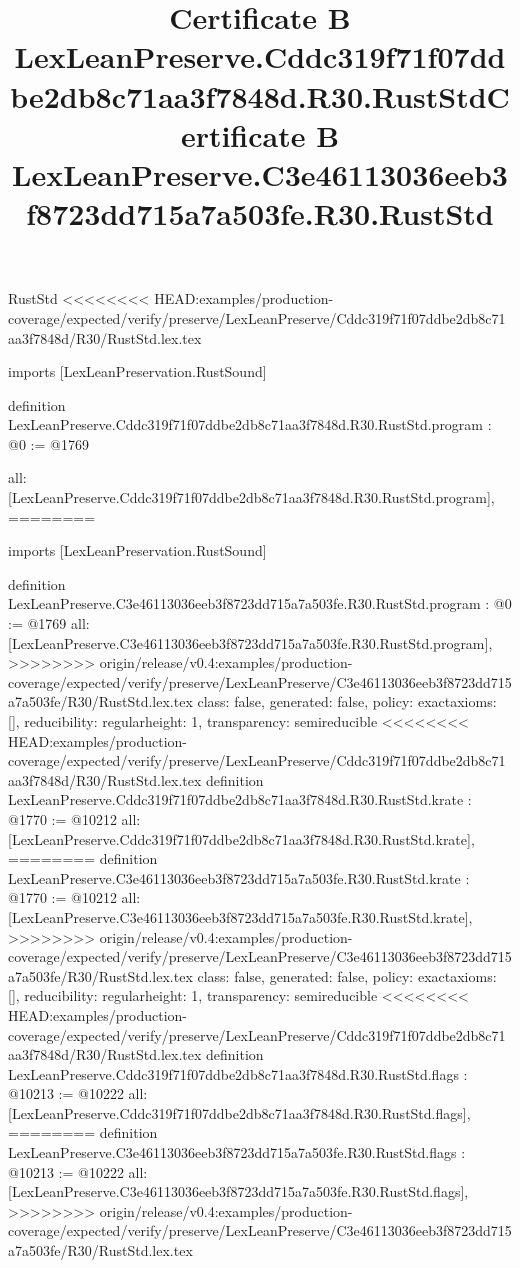 \begin{lexlean}{RustStd}
<<<<<<<< HEAD:examples/production-coverage/expected/verify/preserve/LexLeanPreserve/Cddc319f71f07ddbe2db8c71aa3f7848d/R30/RustStd.lex.tex
\title{Certificate B LexLeanPreserve.Cddc319f71f07ddbe2db8c71aa3f7848d.R30.RustStd}
\begin{coremodule}
imports [LexLeanPreservation.RustSound]

definition LexLeanPreserve.Cddc319f71f07ddbe2db8c71aa3f7848d.R30.RustStd.program : @0 := @1769 {
  all: [LexLeanPreserve.Cddc319f71f07ddbe2db8c71aa3f7848d.R30.RustStd.program],
========
\title{Certificate B LexLeanPreserve.C3e46113036eeb3f8723dd715a7a503fe.R30.RustStd}
\begin{coremodule}
imports [LexLeanPreservation.RustSound]

definition LexLeanPreserve.C3e46113036eeb3f8723dd715a7a503fe.R30.RustStd.program : @0 := @1769 {
  all: [LexLeanPreserve.C3e46113036eeb3f8723dd715a7a503fe.R30.RustStd.program],
>>>>>>>> origin/release/v0.4:examples/production-coverage/expected/verify/preserve/LexLeanPreserve/C3e46113036eeb3f8723dd715a7a503fe/R30/RustStd.lex.tex
  class: false,
  generated: false,
  policy: exact{axioms: []},
  reducibility: regular{height: 1},
  transparency: semireducible
}
<<<<<<<< HEAD:examples/production-coverage/expected/verify/preserve/LexLeanPreserve/Cddc319f71f07ddbe2db8c71aa3f7848d/R30/RustStd.lex.tex
definition LexLeanPreserve.Cddc319f71f07ddbe2db8c71aa3f7848d.R30.RustStd.krate : @1770 := @10212 {
  all: [LexLeanPreserve.Cddc319f71f07ddbe2db8c71aa3f7848d.R30.RustStd.krate],
========
definition LexLeanPreserve.C3e46113036eeb3f8723dd715a7a503fe.R30.RustStd.krate : @1770 := @10212 {
  all: [LexLeanPreserve.C3e46113036eeb3f8723dd715a7a503fe.R30.RustStd.krate],
>>>>>>>> origin/release/v0.4:examples/production-coverage/expected/verify/preserve/LexLeanPreserve/C3e46113036eeb3f8723dd715a7a503fe/R30/RustStd.lex.tex
  class: false,
  generated: false,
  policy: exact{axioms: []},
  reducibility: regular{height: 1},
  transparency: semireducible
}
<<<<<<<< HEAD:examples/production-coverage/expected/verify/preserve/LexLeanPreserve/Cddc319f71f07ddbe2db8c71aa3f7848d/R30/RustStd.lex.tex
definition LexLeanPreserve.Cddc319f71f07ddbe2db8c71aa3f7848d.R30.RustStd.flags : @10213 := @10222 {
  all: [LexLeanPreserve.Cddc319f71f07ddbe2db8c71aa3f7848d.R30.RustStd.flags],
========
definition LexLeanPreserve.C3e46113036eeb3f8723dd715a7a503fe.R30.RustStd.flags : @10213 := @10222 {
  all: [LexLeanPreserve.C3e46113036eeb3f8723dd715a7a503fe.R30.RustStd.flags],
>>>>>>>> origin/release/v0.4:examples/production-coverage/expected/verify/preserve/LexLeanPreserve/C3e46113036eeb3f8723dd715a7a503fe/R30/RustStd.lex.tex
}}}
\end{coremodule}}
\end{coremodule}
\end{lexlean}
